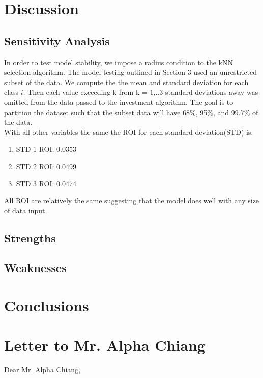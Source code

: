 \documentclass[12pt]{scrartcl}
\begin{document}
\section{Discussion} 
\subsection{Sensitivity Analysis}
In order to test model stability, we impose a radius condition to the kNN selection algorithm. The model testing outlined in Section 3 used an unrestricted subset of the data. We compute the the mean and standard deviation for each class $i$. Then each value exceeding k from k = 1,..3 standard deviations away was omitted from the data passed to the investment algorithm. The goal is to partition the dataset such that the subset data will have 68\%, 95\%, and 99.7\% of the data.\\

With all other variables the same the ROI for each standard deviation(STD) is:
\begin{enumerate}
\item STD 1 ROI: 0.0353
\item STD 2 ROI: 0.0499
\item STD 3 ROI: 0.0474
\end{enumerate}

All ROI are relatively the same suggesting that the model does well with any size of data input. 

\subsection{Strengths}
\subsection{Weaknesses}

\section{Conclusions}
\clearpage

\section{Letter to Mr. Alpha Chiang}
Dear Mr. Alpha Chiang,


\newpage
\end{document}
